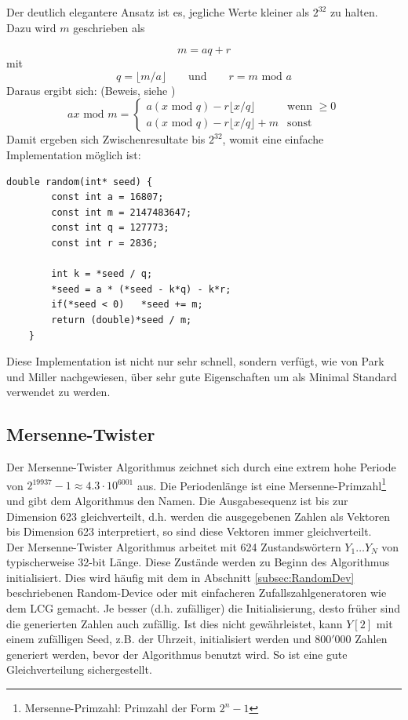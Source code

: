 \documentclass{book}
\begin{document}
\begin{refsection}
Der deutlich elegantere Ansatz ist es, jegliche Werte kleiner als $2^{32}$ zu halten. Dazu wird $m$ geschrieben als

\begin{equation}
	m = aq + r
\end{equation}
mit 
\begin{equation}
	q = \lfloor m/a \rfloor \qquad \text{und} \qquad r = m \text{ mod } a
\end{equation}
Daraus ergibt sich: (Beweis, siehe \cite{rng:ParkMiller1988})
\begin{equation}
	a x \text{ mod } m = 
		\begin{cases}
			a \left(x \text{ mod } q\right) - r \lfloor x / q\rfloor & \text{wenn }\geq 0 \\
			a \left(x \text{ mod } q\right) - r \lfloor x / q\rfloor + m & \text{sonst}
		\end{cases}
\end{equation}
Damit ergeben sich Zwischenresultate bis $2^{32}$, womit eine einfache Implementation möglich ist:

\begin{lstlisting}[style=C]
	double random(int* seed) {
		const int a = 16807;
		const int m = 2147483647;
		const int q = 127773;
		const int r = 2836;
		
		int k = *seed / q;
		*seed = a * (*seed - k*q) - k*r;
		if(*seed < 0)   *seed += m;
		return (double)*seed / m;
	}
\end{lstlisting}
Diese Implementation ist nicht nur sehr schnell, sondern verfügt, wie von Park und Miller \cite{rng:ParkMiller1988} nachgewiesen, über sehr gute Eigenschaften um als Minimal Standard verwendet zu werden.

\newpage
\subsection{Mersenne-Twister} \label{subsec:MersenneTwister}
Der Mersenne-Twister Algorithmus zeichnet sich durch eine extrem hohe Periode von $2^{19937}-1 \approx 4.3 \cdot 10^{6001}$ aus. Die Periodenlänge ist eine Mersenne-Primzahl\footnote{Mersenne-Primzahl: Primzahl der Form $2^{n}-1$} und gibt dem Algorithmus den Namen. Die Ausgabesequenz ist bis zur Dimension 623 gleichverteilt, d.h. werden die ausgegebenen Zahlen als Vektoren bis Dimension 623 interpretiert, so sind diese Vektoren immer gleichverteilt. \\

Der Mersenne-Twister Algorithmus arbeitet mit 624 Zustandswörtern $Y_1 \dots Y_N$ von typischerweise 32-bit Länge. Diese Zustände werden zu Beginn des Algorithmus initialisiert. Dies wird häufig mit dem in Abschnitt \ref{subsec:RandomDev} beschriebenen Random-Device oder mit einfacheren Zufallszahlgeneratoren wie dem LCG gemacht. Je besser (d.h. zufälliger) die Initialisierung, desto früher sind die generierten Zahlen auch zufällig. Ist dies nicht gewährleistet, kann $Y[2]$ mit einem zufälligen Seed, z.B. der Uhrzeit, initialisiert werden und $800'000$ Zahlen generiert werden, bevor der Algorithmus benutzt wird. So ist eine gute Gleichverteilung sichergestellt. \\


\end{refsection}
\end{document}
